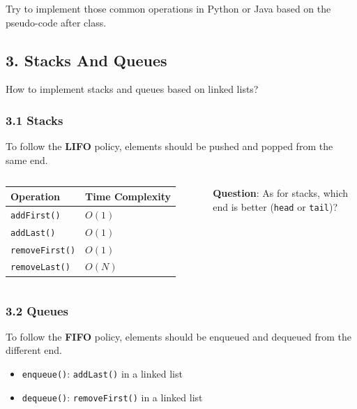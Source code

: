 \documentclass[aspectratio=169, 14pt]{beamer}
\begin{document}
{
\begin{frame}[standout]
	Try to implement those common operations in Python or Java based on the pseudo-code after class.
\end{frame}
}

\begin{frame}
	\section{\textcolor{darkmidnightblue}{3. Stacks And Queues}}
	How to implement stacks and queues based on linked lists?
\end{frame}

\begin{frame}
	\frametitle{3.1 Stacks}
	To follow the \textbf{LIFO} policy, elements should be pushed and popped from the same end.
	\begin{columns}
		\begin{table}
			\begin{tabular}{ll}
				\toprule
				Operation              & Time Complexity \\
				\midrule
				\texttt{addFirst()}    & $O(1)$          \\
				\texttt{addLast()}     & $O(1)$          \\
				\texttt{removeFirst()} & $O(1)$          \\
				\texttt{removeLast()}  & $O(N)$          \\
				\bottomrule
			\end{tabular}
		\end{table}
		{\large {}} \textbf{Question}: As for stacks, which end is better (\texttt{head} or \texttt{tail})?
	\end{columns}

\end{frame}

\begin{frame}
	\frametitle{3.2 Queues}
	To follow the \textbf{FIFO} policy, elements should be enqueued and dequeued from the different end.

	\begin{itemize}
		\item \texttt{enqueue()}: \texttt{addLast()} in a linked list
		\item \texttt{dequeue()}: \texttt{removeFirst()} in a linked list
	\end{itemize}

\end{frame}
\end{document}
